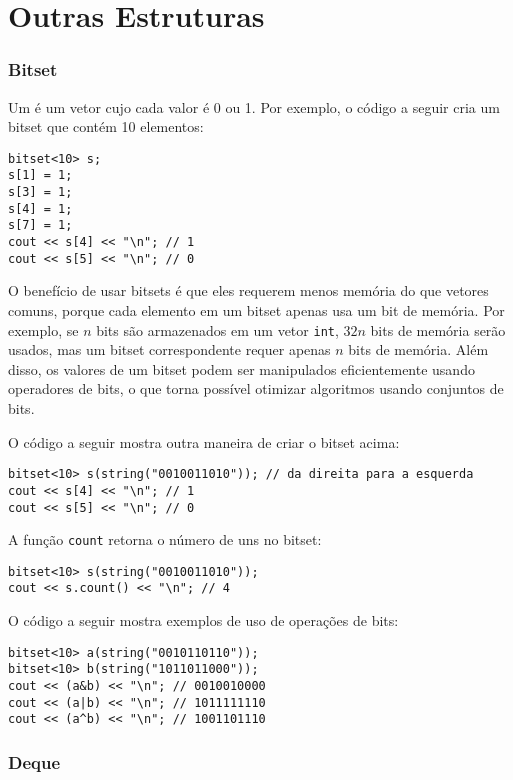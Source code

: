 \section{Outras Estruturas}

\subsubsection{Bitset}


Um  é um vetor
cujo cada valor é 0 ou 1.
Por exemplo, o código a seguir cria
um bitset que contém 10 elementos:
\begin{lstlisting}
bitset<10> s;
s[1] = 1;
s[3] = 1;
s[4] = 1;
s[7] = 1;
cout << s[4] << "\n"; // 1
cout << s[5] << "\n"; // 0
\end{lstlisting}

O benefício de usar bitsets é que
eles requerem menos memória do que vetores comuns,
porque cada elemento em um bitset apenas
usa um bit de memória.
Por exemplo, 
se $n$ bits são armazenados em um vetor \texttt{int},
$32n$ bits de memória serão usados,
mas um bitset correspondente requer apenas $n$ bits de memória.
Além disso, os valores de um bitset
podem ser manipulados eficientemente usando
operadores de bits, o que torna possível
otimizar algoritmos usando conjuntos de bits.

O código a seguir mostra outra maneira de criar o bitset acima:
\begin{lstlisting}
bitset<10> s(string("0010011010")); // da direita para a esquerda
cout << s[4] << "\n"; // 1
cout << s[5] << "\n"; // 0
\end{lstlisting}

A função \texttt{count} retorna o número
de uns no bitset:

\begin{lstlisting}
bitset<10> s(string("0010011010"));
cout << s.count() << "\n"; // 4
\end{lstlisting}

O código a seguir mostra exemplos de uso de operações de bits:
\begin{lstlisting}
bitset<10> a(string("0010110110"));
bitset<10> b(string("1011011000"));
cout << (a&b) << "\n"; // 0010010000
cout << (a|b) << "\n"; // 1011111110
cout << (a^b) << "\n"; // 1001101110
\end{lstlisting}

\subsubsection{Deque}

